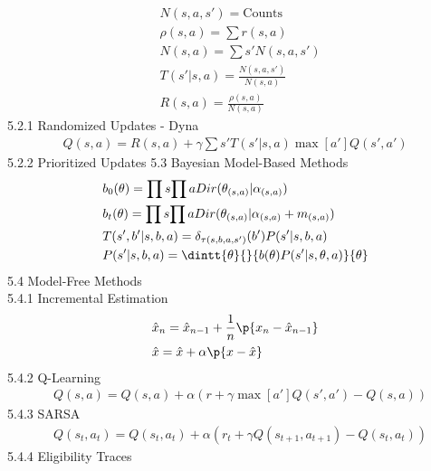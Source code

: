 \documentclass[10pt, oneside]{article}
\begin{document}
\begin{multicols}{2}
  \begin{align*}
    & N(s, a, s') = \text{Counts} \\
    & \rho(s, a) = \sum{}{}{r(s, a)} \\
    & N(s, a) = \sum{s'}{}{N(s, a, s')} \\
    & T(s'|s, a) = \frac{N(s, a, s')}{N(s, a)} \\
    & R(s, a) = \frac{\rho(s, a)}{N(s, a)}
  \end{align*}
  5.2.1 Randomized Updates - Dyna
  \begin{align*}
    Q(s, a) = R(s, a) + \gamma \sum{s'}{}{T(s'|s, a)\max[a']{Q(s',a')}}
  \end{align*}
  5.2.2 Prioritized Updates
5.3 Bayesian Model-Based Methods \\
  \begin{align*}
    & b_0(\theta) = \prod{s}{}{\prod{a}{}{Dir(\theta_{(s, a)} | \alpha_{(s, a)})}} \\
    & b_t(\theta) = \prod{s}{}{\prod{a}{}{Dir(\theta_{(s, a)} | \alpha_{(s, a)} + m_{(s, a)})}} \\
    & T(s', b'| s, b, a) = \delta_{\tau(s, b, a, s')}(b') P(s'|s, b, a) \\
    & P(s'|s, b, a) = \dintt{\theta}{}{b(\theta)P(s'|s, \theta, a)}{\theta}
  \end{align*}
5.4 Model-Free Methods \\
  5.4.1 Incremental Estimation \\
  \begin{align*}
    & \hat{x}_n = \hat{x}_{n-1} + \frac{1}{n}\p{x_n - \hat{x}_{n-1}} \\
    & \hat{x} = \hat{x} + \alpha\p{x - \hat{x}}
  \end{align*}
  5.4.2 Q-Learning \\
  \begin{align*}
    & Q(s, a) = Q(s, a) + \alpha(r + \gamma \max[a']{Q(s', a')} - Q(s, a))
  \end{align*}
  5.4.3 SARSA \\
  \begin{align*}
    & Q(s_t, a_t) = Q(s_t, a_t) + \alpha(r_t + \gamma Q(s_{t+1}, a_{t+1}) - Q(s_t, a_t))
  \end{align*}
  5.4.4 Eligibility Traces \\
\end{multicols}
\end{document}
